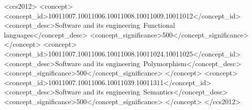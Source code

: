 \documentclass[format=acmsmall, review=false, screen=true]{acmart}
\begin{document}

\begin{CCSXML}
<ccs2012>
<concept>
<concept_id>10011007.10011006.10011008.10011009.10011012</concept_id>
<concept_desc>Software and its engineering~Functional languages</concept_desc>
<concept_significance>500</concept_significance>
</concept>
<concept>
<concept_id>10011007.10011006.10011008.10011024.10011025</concept_id>
<concept_desc>Software and its engineering~Polymorphism</concept_desc>
<concept_significance>500</concept_significance>
</concept>
<concept>
<concept_id>10011007.10011006.10011039.10011311</concept_id>
<concept_desc>Software and its engineering~Semantics</concept_desc>
<concept_significance>500</concept_significance>
</concept>
</ccs2012>
\end{CCSXML}






\maketitle





















\newpage
\appendix

\end{document}
